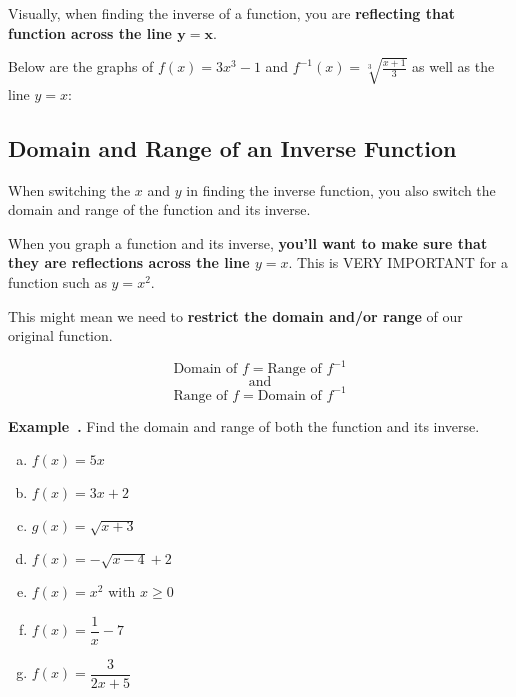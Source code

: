 \documentclass{article}
\newcounter{example}[section]
\newenvironment{example}[1][]{\refstepcounter{example}\par\medskip
   {\color{red}\textbf{Example~\theexample. #1}}}{\medskip}
\begin{document}
\vfill 
\newpage 

Visually, when finding the inverse of a function, you are {\color{blue}\textbf{reflecting that function across the line $\bm{y = x}$}}.	
\vspace{0.25in}


Below are the graphs of $f(x) = 3x^3-1$ and $f^{-1}(x) = \sqrt[3]{\frac{x+1}{3}}$ as well as the line $y=x$:	\newline\\
\begin{center}
\end{center}
\vspace{0.25in}


\iffalse

\subsection*{Domain and Range of an Inverse Function}

When switching the $x$ and $y$ in finding the inverse function, you also switch the domain and range of the function and its inverse.		
\vfill 

When you graph a function and its inverse, {\color{blue}\textbf{you'll want to make sure that they are reflections across the line $y=x$}}. This is VERY IMPORTANT for a function such as $y = x^2$.	
\vfill 

This might mean we need to \textbf{restrict the domain and/or range} of our original function.

\[\text{Domain of }f = \text{Range of }f^{-1}\]
\[\text{and}\]
\[\text{Range of }f = \text{Domain of }f^{-1}\]
\vfill 
\newpage

\begin{example}
Find the domain and range of both the function and its inverse.
\begin{enumerate}[(a)]
    \item $f(x) = 5x$   \vfill 
    \item $f(x) = 3x+2$ \vfill 
    \item $g(x) = \sqrt{x+3}$   \vfill \newpage
    \item $f(x) = -\sqrt{x-4}+2$    \vfill 
    \item $f(x) = x^2$ with $x \geq 0$  \vfill 
    \item $f(x) = \dfrac{1}{x}-7$   \vfill \newpage
    \item $f(x)= \dfrac{3}{2x+5}$
\end{enumerate}
\end{example}
\end{document}
